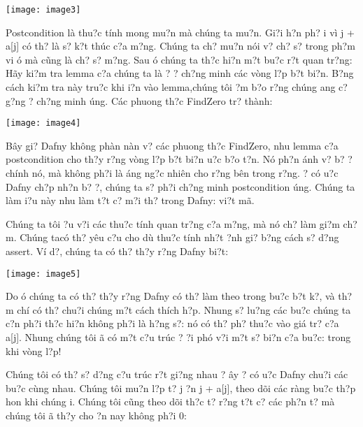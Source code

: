 \documentclass{article} %
\begin{document}
\noindent \texttt{[image: image3]}

Postcondition l\`{a} thu?c t\'{i}nh mong mu?n m\`{a} ch\'{u}ng ta mu?n. Gi?i h?n ph? i v\`{i} j + a[j] c\'{o} th? l\`{a} s? k?t th\'{u}c c?a m?ng. Ch\'{u}ng ta ch? mu?n n\'{o}i v? ch? s? trong ph?m vi {\dj}\'{o} m\`{a} c\~{u}ng l\`{a} ch? s? m?ng. Sau {\dj}\'{o} ch\'{u}ng ta th?c hi?n m?t bu?c r?t quan tr?ng: H\~{a}y ki?m tra lemma c?a ch\'{u}ng ta l\`{a} {\dj}? {\dj}? ch?ng minh c\'{a}c v\`{o}ng l?p b?t bi?n. B?ng c\'{a}ch ki?m tra n\`{a}y tru?c khi {\dj}i?n v\`{a}o lemma,ch\'{u}ng t\^{o}i {\dj}?m b?o r?ng ch\'{u}ng {\dj}ang c? g?ng {\dj}? ch?ng minh {\dj}\'{u}ng. C\'{a}c phuong th?c FindZero tr? th\`{a}nh:

\noindent \texttt{[image: image4]}

B\^{a}y gi? Dafny kh\^{o}ng ph\`{a}n n\`{a}n v? c\'{a}c phuong th?c FindZero, nhu lemma c?a postcondition cho th?y r?ng v\`{o}ng l?p b?t bi?n {\dj}u?c b?o t?n. N\'{o} ph?n \'{a}nh v? b? {\dj}? ch\'{i}nh n\'{o}, m\`{a} kh\^{o}ng ph?i l\`{a} {\dj}\'{a}ng ng?c nhi\^{e}n cho r?ng b\^{e}n trong r?ng. {\DJ}? c\'{o} {\dj}u?c Dafny ch?p nh?n b? {\dj}?, ch\'{u}ng ta s? ph?i ch?ng minh postcondition {\dj}\'{u}ng. Ch\'{u}ng ta l\`{a}m {\dj}i?u n\`{a}y nhu  l\`{a}m t?t c? m?i th? trong Dafny: vi?t m\~{a}.

Ch\'{u}ng ta t\^{o}i {\dj}?u v?i c\'{a}c thu?c t\'{i}nh quan tr?ng c?a m?ng, m\`{a} n\'{o} ch? l\`{a}m gi?m ch?m. Ch\'{u}ng tac\'{o} th? y\^{e}u c?u cho d\`{u} thu?c t\'{i}nh nh?t {\dj}?nh gi? b?ng c\'{a}ch s? d?ng assert. V\'{i} d?, ch\'{u}ng ta c\'{o} th? th?y r?ng Dafny bi?t:

\noindent \texttt{[image: image5]}

Do {\dj}\'{o} ch\'{u}ng ta c\'{o} th? th?y r?ng Dafny c\'{o} th? l\`{a}m theo trong bu?c b?t k?, v\`{a} th?m ch\'{i} c\'{o} th? chu?i ch\'{u}ng m?t c\'{a}ch th\'{i}ch h?p. Nhung s? lu?ng c\'{a}c bu?c ch\'{u}ng ta c?n ph?i th?c hi?n kh\^{o}ng ph?i l\`{a} h?ng s?: n\'{o} c\'{o} th? ph? thu?c v\`{a}o gi\'{a} tr? c?a a[j]. Nhung ch\'{u}ng t\^{o}i {\dj}\~{a} c\'{o} m?t c?u tr\'{u}c {\dj}? {\dj}?i ph\'{o} v?i m?t s? bi?n c?a bu?c: trong khi v\`{o}ng l?p!

Ch\'{u}ng t\^{o}i c\'{o} th? s? d?ng c?u tr\'{u}c r?t gi?ng nhau ? {\dj}\^{a}y {\dj}? c\'{o} {\dj}u?c Dafny chu?i c\'{a}c bu?c c\`{u}ng nhau. Ch\'{u}ng t\^{o}i mu?n l?p t? j {\dj}?n j + a[j], theo d\~{o}i c\'{a}c r\`{a}ng bu?c th?p hon khi ch\'{u}ng {\dj}i. Ch\'{u}ng t\^{o}i c\~{u}ng theo d\~{o}i th?c t? r?ng t?t c? c\'{a}c ph?n t? m\`{a} ch\'{u}ng t\^{o}i {\dj}\~{a} th?y cho {\dj}?n nay kh\^{o}ng ph?i 0:
\end{document}
